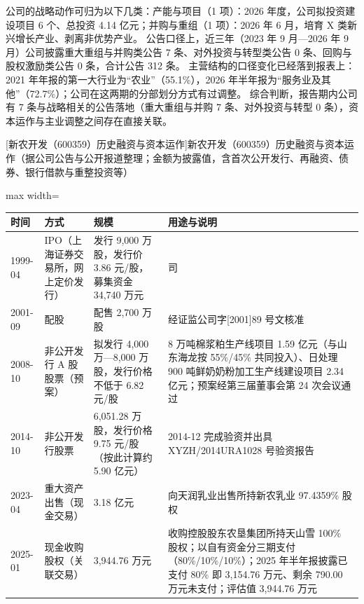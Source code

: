  公司的战略动作可归为以下几类：产能与项目（1 项）：2026 年度，公司拟投资建设项目 6 个、总投资 4.14 亿元；并购与重组（1 项）：2026 年 6 月，培育 X 类新兴增长产业、剥离非优势产业。 公告口径上，近三年（2023 年 9 月---2026 年 9 月）公司披露重大重组与并购类公告 7 条、对外投资与转型类公告 0 条、回购与股权激励类公告 0 条，合计公告 312 条。 主营结构的口径变化已经落到报表上：2021 年年报的第一大行业为“农业”（55.1\%），2026 年半年报为“服务业及其他”（72.7\%）；公司在这两期的分部划分方式有过调整。 综合判断，报告期内公司有 7 条与战略相关的公告落地（重大重组与并购 7 条、对外投资与转型 0 条），资本运作与主业调整之间存在直接关联。

\begin{center}\small\setlength{\tabcolsep}{4pt}
[新农开发（600359）历史融资与资本运作]{新农开发（600359）历史融资与资本运作（据公司公告与公开报道整理；金额为披露值，含首次公开发行、再融资、债券、银行借款与重整投资等）}
\begin{adjustbox}{max width=\textwidth}
\begin{tabular}{@{}p{1.45cm}p{2.55cm}p{4.05cm}p{4.95cm}@{}}
\toprule
时间 & 方式 & 规模 & 用途与说明 \\
\midrule
1999-04 & IPO（上海证券交易所，网上定价发行） & 发行 9,\allowbreak{}000 万股，\allowbreak{}发行价 3.86 元/\allowbreak{}股，\allowbreak{}募集资金 34,\allowbreak{}740 万元 & 司 \\
2001-09 & 配股 & 配售 2,\allowbreak{}700 万股 & 经证监公司字[2001]89 号文核准 \\
2008-10 & 非公开发行 A 股股票（预案） & 拟发行 4,\allowbreak{}000 万—8,\allowbreak{}000 万股，\allowbreak{}发行价格不低于 6.82 元/\allowbreak{}股 & 8 万吨棉浆粕生产线项目 1.59 亿元（与山东海龙按 55\%/\allowbreak{}45\% 共同投入）、\allowbreak{}日处理 900 吨鲜奶奶粉加工生产线建设项目 2.34 亿元；预案经第三届董事会第 24 次会议通过 \\
2014-10 & 非公开发行股票 & 6,\allowbreak{}051.28 万股，\allowbreak{}发行价格 9.75 元/\allowbreak{}股（按此计算约 5.90 亿元） & 2014-12 完成验资并出具 XYZH/\allowbreak{}2014URA1028 号验资报告 \\
2023-04 & 重大资产出售（现金交易） & 3.18 亿元 & 向天润乳业出售所持新农乳业 97.4359\% 股权 \\
2025-01 & 现金收购股权（关联交易） & 3,\allowbreak{}944.76 万元 & 收购控股股东农垦集团所持天山雪 100\% 股权；以自有资金分三期支付（80\%/\allowbreak{}10\%/\allowbreak{}10\%）；2025 年半年报披露已支付 80\% 即 3,\allowbreak{}154.76 万元、\allowbreak{}剩余 790.00 万元未支付；评估值 3,\allowbreak{}944.76 万元 \\
\bottomrule
\end{tabular}
\end{adjustbox}
\end{center}


